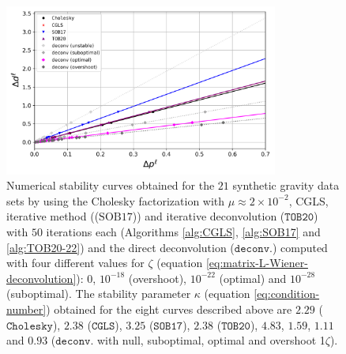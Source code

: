 \begin{figure}[htbp]
	\begin{center}
		\includegraphics[width=9cm]{Fig/stability-comparison}
	\end{center}
	\caption{
		Numerical stability curves obtained for the $21$ synthetic gravity data sets 
		by using the Cholesky factorization with $\mu \approx 2 \times 10^{-2}$, 
		CGLS, iterative method (($\mathrm{SOB17}$)) and iterative deconvolution
		($\mathtt{TOB20}$) with $50$ iterations each (Algorithms \ref{alg:CGLS}, \ref{alg:SOB17} and \ref{alg:TOB20-22}) 
		and the direct deconvolution ($\mathtt{deconv.}$) computed with four different values for $\zeta$ 
		(equation \ref{eq:matrix-L-Wiener-deconvolution}): $0$, $10^{-18}$ (overshoot), $10^{-22}$ (optimal)
		and $10^{-28}$ (suboptimal).
		The stability parameter $\kappa$ (equation \ref{eq:condition-number}) obtained for the eight curves described above are $2.29$ ($\mathtt{Cholesky}$), $2.38$ 
		($\mathtt{CGLS}$), $3.25$ ($\mathtt{SOB17}$), $2.38$ ($\mathtt{TOB20}$), $4.83$, $1.59$, $1.11$ and $0.93$ ($\mathtt{deconv.}$ with null, suboptimal, optimal and overshoot 1$\zeta$).
		}
	\label{fig:stability-comparison}
\end{figure}

